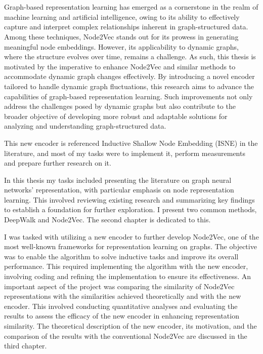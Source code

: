 \chapter{\bevezetes}

Graph-based representation learning has emerged as a cornerstone in the realm of machine learning and artificial intelligence, owing to its ability to effectively capture and interpret complex relationships inherent in graph-structured data. Among these techniques, Node2Vec stands out for its prowess in generating meaningful node embeddings. However, its applicability to dynamic graphs, where the structure evolves over time, remains a challenge. As such, this thesis is motivated by the imperative to enhance Node2Vec and similar methods to accommodate dynamic graph changes effectively. By introducing a novel encoder tailored to handle dynamic graph fluctuations, this research aims to advance the capabilities of graph-based representation learning. Such improvements not only address the challenges posed by dynamic graphs but also contribute to the broader objective of developing more robust and adaptable solutions for analyzing and understanding graph-structured data.

This new encoder is referenced Inductive Shallow Node Embedding (ISNE) in the literature, and most of my tasks were to implement it, perform measurements and prepare further research on it.

In this thesis my tasks included presenting the literature on graph neural networks' representation, with particular emphasis on node representation learning. This involved reviewing existing research and summarizing key findings to establish a foundation for further exploration. I present two common methods, DeepWalk and Node2Vec. The second chapter is dedicated to this.

I was tasked with utilizing a new encoder to further develop Node2Vec, one of the most well-known frameworks for representation learning on graphs. The objective was to enable the algorithm to solve inductive tasks and improve its overall performance. This required implementing the algorithm with the new encoder, involving coding and refining the implementation to ensure its effectiveness. An important aspect of the project was comparing the similarity of Node2Vec representations with the similarities achieved theoretically and with the new encoder. This involved conducting quantitative analyses and evaluating the results to assess the efficacy of the new encoder in enhancing representation similarity. The theoretical description of the new encoder, its motivation, and the comparison of the results with the conventional Node2Vec are discussed in the third chapter.

